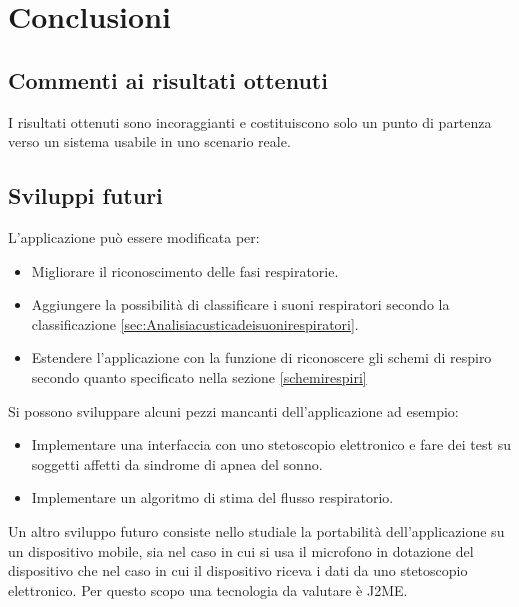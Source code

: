 \chapter{Conclusioni}

  \section{Commenti ai risultati ottenuti}

    I risultati ottenuti sono incoraggianti e costituiscono solo un punto di partenza verso un sistema usabile in uno scenario reale.


  \section{Sviluppi futuri}
    L'applicazione pu\`o essere modificata per:
    \begin{itemize}
      \item
	Migliorare il riconoscimento delle fasi respiratorie.
      \item
	Aggiungere la possibilit\`a di classificare i suoni respiratori secondo la classificazione \ref{sec:Analisiacusticadeisuonirespiratori}.
      \item
	Estendere l'applicazione con la funzione di riconoscere gli schemi di respiro secondo quanto specificato nella sezione \ref{schemirespiri}
    \end{itemize}


    Si possono sviluppare alcuni pezzi mancanti dell'applicazione ad esempio:
    \begin{itemize}
      \item 
	Implementare una interfaccia con uno stetoscopio elettronico e fare dei test su soggetti affetti da sindrome di apnea del sonno.
      \item
	Implementare un algoritmo di stima del flusso respiratorio.
    \end{itemize}
  

    Un altro sviluppo futuro consiste nello studiale la portabilit\`a dell'applicazione su un dispositivo mobile, sia nel caso in cui si usa il microfono in dotazione del dispositivo che nel caso in cui il dispositivo riceva i dati da uno stetoscopio elettronico. 
    Per questo scopo una tecnologia da valutare \`e J2ME.


